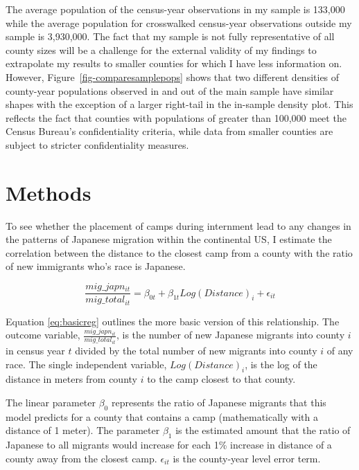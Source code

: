 \documentclass[12pt]{article}
\begin{document}
The average population of the census-year observations in my sample is
133,000 while the average population for
crosswalked census-year observations outside my sample is
3,930,000. The fact that my sample is not
fully representative of all county sizes will be a challenge for the
external validity of my findings to extrapolate my results to smaller
counties for which I have less information on. However,
Figure~\ref{fig-comparesamplepops} shows that two different densities of
county-year populations observed in and out of the main sample have
similar shapes with the exception of a larger right-tail in the
in-sample density plot. This reflects the fact that counties with
populations of greater than 100,000 meet the Census Bureau's
confidentiality criteria, while data from smaller counties are subject
to stricter confidentiality measures.

\section{Methods}\label{methods}

To see whether the placement of camps during internment lead to any changes in the patterns of Japanese migration within the continental US, I estimate the correlation between the distance to the closest camp from a county with the ratio of new immigrants who's race is Japanese. 

\begin{equation}\label{eq:basicreg}
    \frac{mig\_japn_{it}}{mig\_total_{it}} = \beta_{0t} + \beta_{1t} Log(Distance)_i  +  \epsilon_{it}
\end{equation}


Equation \ref{eq:basicreg} outlines the more basic version of this relationship. 
The outcome variable, $\frac{mig\_japn_{it}}{mig\_total_{it}}$, is the number of new Japanese migrants into county $i$ in census year $t$ divided by the total number of new migrants into county $i$ of any race.
The single independent variable, $Log(Distance)_i$, is the log of the distance in meters from county $i$ to the camp closest to that county.

The linear parameter $\beta_0$ represents the ratio of Japanese migrants that this model predicts for a county that contains a camp (mathematically with a distance of 1 meter).
The parameter $\beta_1$ is the estimated amount that the ratio of Japanese to all migrants would increase for each 1\% increase in distance of a county away from the closest camp.
$\epsilon_{it}$ is the county-year level error term.
\end{document}
